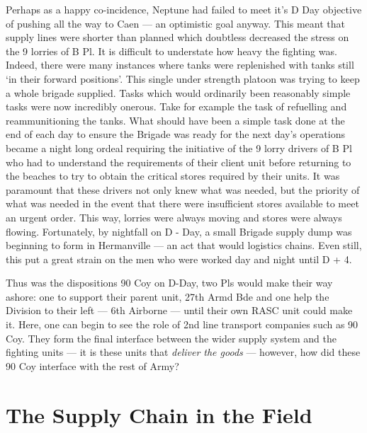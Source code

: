 \documentclass[noraggedright]{turabian-researchpaper}
\begin{document}
Perhaps as a happy co-incidence, Neptune had failed to meet it's D Day 
objective of pushing all the way to Caen --- an optimistic goal anyway.%
This meant that supply lines were shorter than planned which doubtless 
decreased the stress on the 9 lorries of B Pl.  
It is difficult to understate how heavy the 
fighting was.  Indeed, there were many instances where tanks were replenished
with tanks still `in their forward positions'.\autocite[2]{90wdjun}
This single under strength platoon was trying to keep a whole brigade supplied.
Tasks which would ordinarily been reasonably simple tasks were now incredibly
onerous.  Take for example the task of refuelling and reammunitioning the tanks.
What should have been a simple task done at the end of each day to ensure the
Brigade was ready for the next day's operations became a night long ordeal 
requiring the initiative of the 9 lorry drivers of B Pl who had to understand
the requirements of their client unit before returning to the beaches to try 
to obtain the critical stores required by their units.  It was paramount that
these drivers not only knew what was needed, but the priority of what was 
needed in the event that there were insufficient stores available to meet
an urgent order.  This way, lorries were always moving and stores were 
always flowing.  Fortunately, by nightfall on D - Day, a small Brigade supply
dump was beginning to form in Hermanville --- an act that would logistics 
chains.  Even still, this put a great strain on the men who were
worked day and night until D + 4.\autocite[2]{90wdjun}


Thus was the dispositions 90 Coy on D-Day, two Pls would make their way ashore:
one to support their parent unit, 27th Armd Bde and one help the Division to
their left --- 6th Airborne --- until their own RASC unit could make it. Here,
one can begin to see the role of 2nd line transport companies such as 90 Coy.  
They form the final interface between the wider supply system and the fighting
units ---  it is these units that \textit{deliver the goods} --- however, how
did these 90 Coy interface with the rest of Army?  


\section{The Supply Chain in the Field} 
\end{document}
